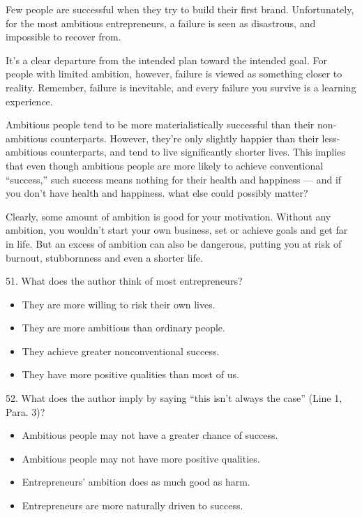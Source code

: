 \documentclass[UTF8,11pt]{ctexart}
\begin{document}
Few people are successful when they try to build their first brand. Unfortunately, for the most ambitious entrepreneurs, a failure is seen as disastrous, and impossible to recover from.


It’s a clear departure from the intended plan toward the intended goal. For people with limited ambition, however, failure is viewed as something closer to reality. Remember, failure is inevitable, and every failure you survive is a learning experience.


Ambitious people tend to be more materialistically successful than their non-ambitious counterparts. However, they’re only slightly happier than their less-ambitious counterparts, and tend to live significantly shorter lives. This implies that even though ambitious people are more likely to achieve conventional “success,” such success means nothing for their health and happiness — and if you don’t have health and happiness. what else could possibly matter?


Clearly, some amount of ambition is good for your motivation. Without any ambition, you wouldn’t start your own business, set or achieve goals and get far in life. But an excess of ambition can also be dangerous, putting you at risk of burnout, stubbornness and even a shorter life.


51. What does the author think of most entrepreneurs?


\begin{itemize}[leftmargin=2em,itemsep=.2em,topsep=.4em]\item[A.] They are more willing to risk their own lives.
\item[B.] They are more ambitious than ordinary people.
\item[C.] They achieve greater nonconventional success.
\item[D.] They have more positive qualities than most of us.
\end{itemize}

52. What does the author imply by saying “this isn’t always the case” (Line 1, Para. 3)?


\begin{itemize}[leftmargin=2em,itemsep=.2em,topsep=.4em]\item[A.] Ambitious people may not have a greater chance of success.
\item[B.] Ambitious people may not have more positive qualities.
\item[C.] Entrepreneurs’ ambition does as much good as harm.
\item[D.] Entrepreneurs are more naturally driven to success.
\end{itemize}
\end{document}

